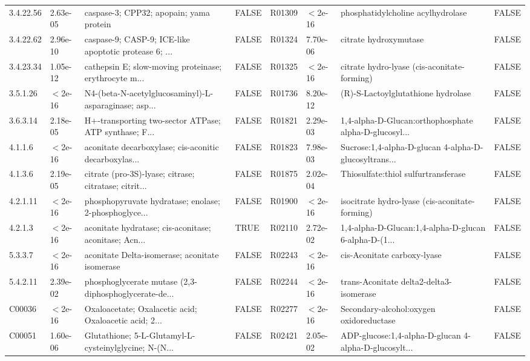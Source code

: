 \documentclass{article}\usepackage[]{graphicx}\usepackage[]{color}
\begin{document}
{{\begin{tabular}{llllllll}
  3.4.22.56 &  2.63e-05 & caspase-3; CPP32; apopain; yama protein & FALSE & R01309 & $<$2e-16 & phosphatidylcholine acylhydrolase & FALSE \\ 
  3.4.22.62 &  2.96e-10 & caspase-9; CASP-9; ICE-like apoptotic protease 6; ... & FALSE & R01324 &  7.70e-06 & citrate hydroxymutase & FALSE \\ 
  3.4.23.34 &  1.05e-12 & cathepsin E; slow-moving proteinase; erythrocyte m... & FALSE & R01325 & $<$2e-16 & citrate hydro-lyase (cis-aconitate-forming) & FALSE \\ 
  3.5.1.26 & $<$2e-16 & N4-(beta-N-acetylglucosaminyl)-L-asparaginase; asp... & FALSE & R01736 &  8.20e-12 & (R)-S-Lactoylglutathione hydrolase & FALSE \\ 
  3.6.3.14 &  2.18e-05 & H+-transporting two-sector ATPase; ATP synthase; F... & FALSE & R01821 &  2.29e-03 & 1,4-alpha-D-Glucan:orthophosphate alpha-D-glucosyl... & FALSE \\ 
  4.1.1.6 & $<$2e-16 & aconitate decarboxylase; cis-aconitic decarboxylas... & FALSE & R01823 &  7.98e-03 & Sucrose:1,4-alpha-D-glucan 4-alpha-D-glucosyltrans... & FALSE \\ 
  4.1.3.6 &  2.19e-05 & citrate (pro-3S)-lyase; citrase; citratase; citrit... & FALSE & R01875 &  2.02e-04 & Thiosulfate:thiol sulfurtransferase & FALSE \\ 
  4.2.1.11 & $<$2e-16 & phosphopyruvate hydratase; enolase; 2-phosphoglyce... & FALSE & R01900 & $<$2e-16 & isocitrate hydro-lyase (cis-aconitate-forming) & FALSE \\ 
  4.2.1.3 & $<$2e-16 & aconitate hydratase; cis-aconitase; aconitase; Acn... & TRUE & R02110 &  2.72e-02 & 1,4-alpha-D-Glucan:1,4-alpha-D-glucan 6-alpha-D-(1... & FALSE \\ 
  5.3.3.7 & $<$2e-16 & aconitate Delta-isomerase; aconitate isomerase & FALSE & R02243 & $<$2e-16 & cis-Aconitate carboxy-lyase & FALSE \\ 
  5.4.2.11 &  2.39e-02 & phosphoglycerate mutase (2,3-diphosphoglycerate-de... & FALSE & R02244 & $<$2e-16 & trans-Aconitate delta2-delta3-isomerase & FALSE \\ 
  C00036 & $<$2e-16 & Oxaloacetate; Oxalacetic acid; Oxaloacetic acid; 2... & FALSE & R02277 & $<$2e-16 & Secondary-alcohol:oxygen oxidoreductase & FALSE \\ 
  C00051 &  1.60e-06 & Glutathione; 5-L-Glutamyl-L-cysteinylglycine; N-(N... & FALSE & R02421 &  2.05e-02 & ADP-glucose:1,4-alpha-D-glucan 4-alpha-D-glucosylt... & FALSE \\ 

\end{tabular}}}
\end{document}
